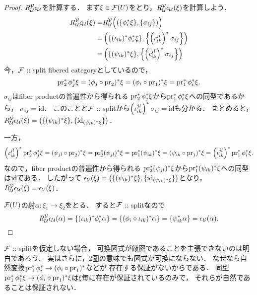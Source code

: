 \documentclass[a4paper, dvipdfmx]{jsarticle}
\begin{document}
\begin{proof}
    $R_{\covU}^{\covV}\epsilon_{\covU}$を計算する．
    まず$\xi \in \shF(U)$をとり，$R_{\covU}^{\covV}\epsilon_{\covU}(\xi)$を計算しよう．
    \begin{align*}
        R_{\covU}^{\covV}\epsilon_{\covU}(\xi)
        =&  R_{\covU}^{\covV}\Big( (\{\phi_i^*\xi\}, \{\sigma_{ij}\}) \Big) \\
        =&  \left(\{(\iota_{ik})^*\phi_i^*\xi\}, \left\{\left(\iota_{ik}^{jl}\right)^*\sigma_{ij} \right\}\right) \\
        =&  \left(\{(\psi_{ik})^*\xi\}, \left\{\left(\iota_{ik}^{jl}\right)^*\sigma_{ij} \right\}\right)
    \end{align*}
    今，$\shF$ :: split fibered categoryとしているので，
    \[ \pr_2^*\phi_j^* \xi=(\phi_j \circ \pr_2)^*\xi=(\phi_i \circ \pr_1)^*\xi=\pr_1^*\phi_i^* \xi. \]
    $\sigma_{ij}$はfiber productの普遍性から得られる
    $\pr_2^*\phi_j^* \xi$から$\pr_1^*\phi_i^* \xi$への同型であるから，
    $\sigma_{ij}=\id$．
    このことと$\shF$ :: splitから$\left(\iota_{ik}^{jl}\right)^*\sigma_{ij}=\id$も分かる．
    まとめると，
    $R_{\covU}^{\covV}\epsilon_{\covU}(\xi)=\left(\{(\psi_{ik})^*\xi\}, \{\id[(\psi_{ik})^*\xi]\}\right)$．

    一方，
    \[
        \left(\iota_{ik}^{jl}\right)^*\pr_2^*\phi_j^* \xi
        =(\psi_{jl} \circ \pr_2)^*\xi
        =\pr_2^*(\psi_{jl})^*\xi
        =\pr_1^*(\psi_{ik})^*\xi
        =(\psi_{ik} \circ \pr_1)^*\xi
        =\left(\iota_{ik}^{jl}\right)^*\pr_1^*\phi_i^* \xi.
    \]
    なので，fiber productの普遍性から得られる
    $\pr_2^*(\psi_{jl})^*\xi$から$\pr_1^*(\psi_{ik})^*\xi$への同型は$\id$である．
    したがって
    $\epsilon_{\covV}(\xi)=\left(\{(\psi_{ik})^*\xi\}, \{\id[(\psi_{ik})^*\xi]\}\right)$となり，
    $R_{\covU}^{\covV}\epsilon_{\covU}(\xi)=\epsilon_{\covV}(\xi)$．
    
    $\shF(U)$の射$\alpha \colon \xi_1 \to \xi_2$をとる．
    すると$\shF$ :: splitなので
    \[
        R_{\covU}^{\covV}\epsilon_{\covU}(\alpha)
        =\{(\iota_{ik})^*\phi_i^*\alpha\}=\{(\phi_i \circ \iota_{ik})^*\alpha\}=\{\psi_{ik}^*\alpha\}
        =\epsilon_{\covV}(\alpha).
    \]
\end{proof}
\begin{Remark}
    $\shF$ :: splitを仮定しない場合，
    可換図式が厳密であることを主張できないのは明白であろう．
    実はさらに，$2$圏の意味でも図式が可換にならない．
    なぜなら自然変換$\pr_1^* \phi_i^* \to (\phi_i \circ \pr_1)^*$などが
    存在する保証がないからである．
    同型$\pr_1^* \phi_i^*\xi \to (\phi_i \circ \pr_1)^*\xi$は$\xi$毎に存在が保証されているのみで，
    それらが自然であることは保証されない．
\end{Remark}
\end{document}
